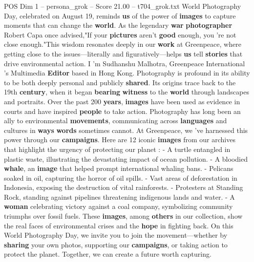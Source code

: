 \begin{textsample}{POS Dim 1 – persona\_grok – Score 21.00 – t704\_grok.txt}  \label{ex:f1_pos_033}
World Photography Day, celebrated on August 19, reminds \textbf{us} of the power of \textbf{images} to capture moments that can change the \textbf{world}.
As the legendary \textbf{war} \textbf{photographer} Robert Capa once advised,"If your \textbf{pictures} aren't \textbf{good} enough, you 're not close enough."This wisdom resonates deeply in our \textbf{work} at Greenpeace, where getting close to the issues—literally and figuratively—helps \textbf{us} tell \textbf{stories} that drive environmental action.
I 'm Sudhanshu Malhotra, Greenpeace International 's Multimedia \textbf{Editor} based in Hong Kong.
Photography is profound in its ability to be both deeply personal and publicly \textbf{shared}.
Its origins trace back to the 19th \textbf{century}, when it began \textbf{bearing} \textbf{witness} to the \textbf{world} through landscapes and portraits.
Over the past 200 \textbf{years}, \textbf{images} have been used as evidence in courts and have inspired \textbf{people} to take action.
Photography has long been an ally to environmental \textbf{movements}, communicating across \textbf{languages} and cultures in \textbf{ways} \textbf{words} sometimes cannot.
At Greenpeace, we 've harnessed this power through our \textbf{campaigns}.
Here are 12 iconic \textbf{images} from our archives that highlight the urgency of protecting our planet : - A turtle entangled in plastic waste, illustrating the devastating impact of ocean pollution. - A bloodied \textbf{whale}, an \textbf{image} that helped prompt international whaling bans. - Pelicans soaked in oil, capturing the horror of oil spills. - Vast areas of deforestation in Indonesia, exposing the destruction of vital rainforests. - Protesters at Standing Rock, standing against pipelines threatening indigenous lands and water. - A \textbf{woman} celebrating victory against a coal company, symbolizing community triumphs over fossil fuels.
These \textbf{images}, among \textbf{others} in our collection, show the real faces of environmental crises and the \textbf{hope} in fighting back.
On this World Photography Day, we invite you to join the movement—whether by \textbf{sharing} your own photos, supporting our \textbf{campaigns}, or taking action to protect the planet.
Together, we can create a future worth capturing.

\end{textsample}

